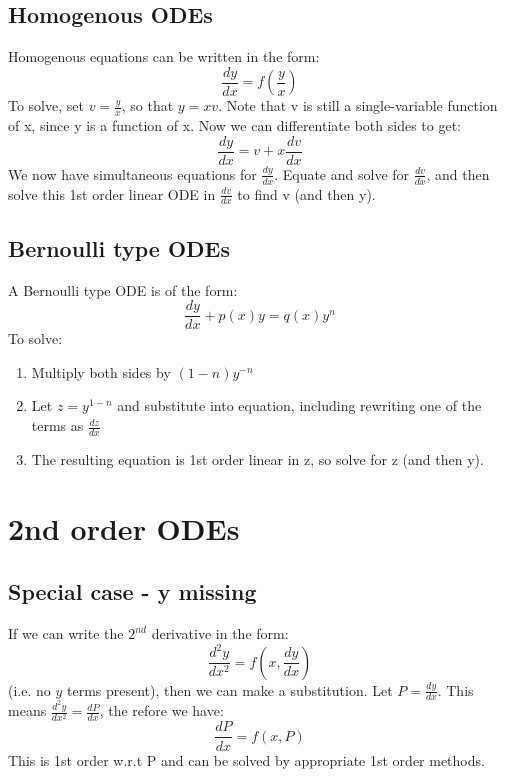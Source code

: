 \documentclass{scrartcl}
\begin{document}
\subsection{Homogenous ODEs}
Homogenous equations can be written in the form:
\begin{equation}
\frac{dy}{dx} = f(\frac{y}{x})
\end{equation}
To solve, set $ v = \frac{y}{x} $, so that $y = xv $. Note that v is still a single-variable function of x, since y is a function of x.
Now we can differentiate both sides to get:
\begin{equation}
\frac{dy}{dx} = v + x\frac{dv}{dx}
\end{equation}
We now have simultaneous equations for $ \frac{dy}{dx} $. Equate and solve for $ \frac{dv}{dx} $, and then solve this 1st order linear ODE in $ \frac{dv}{dx} $ to find v (and then y).

\subsection{Bernoulli type ODEs}
A Bernoulli type ODE is of the form:
\begin{equation}
\frac{dy}{dx} + p(x)y = q(x)y^n
\end{equation}
To solve:
\begin{enumerate}
\item Multiply both sides by $ (1-n)y^{-n} $
\item Let $ z = y^{1-n} $ and substitute into equation, including rewriting one of the terms as $ \frac{dz}{dx} $
\item The resulting equation is 1st order linear in z, so solve for z (and then y).
\end{enumerate}

\section{2nd order ODEs}

\subsection{Special case - y missing}
If we can write the $ 2^{nd} $ derivative in the form:
\begin{equation}
\frac{d^{2}y}{dx^{2}} = f(x, \frac{dy}{dx})
\end{equation}
(i.e. no $ y $ terms present), then we can make a substitution. Let $ P = \frac{dy}{dx} $. This means $ \frac{d^{2}y}{dx^{2}} = \frac{dP}{dx} $, the
refore we have:
\begin{equation}
\frac{dP}{dx} = f(x, P)
\end{equation}
This is 1st order w.r.t P and can be solved by appropriate 1st order methods.
\end{document}
